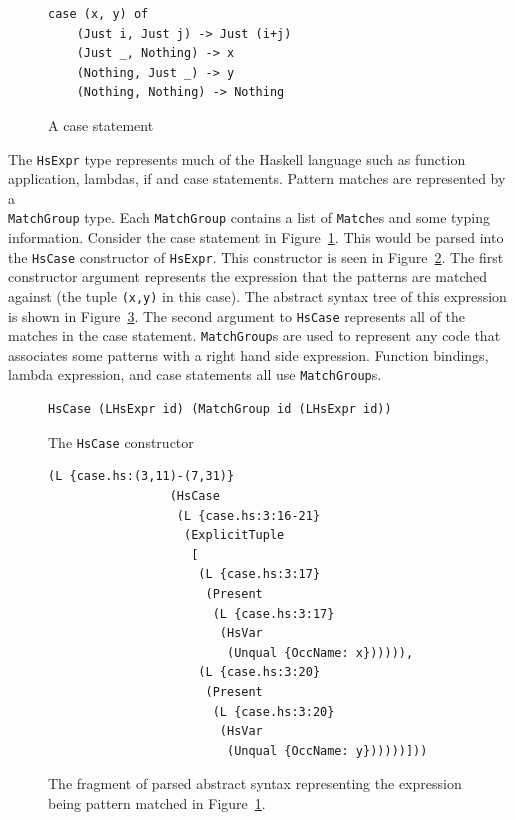 \begin{figure}[t]
\begin{lstlisting}
case (x, y) of
	(Just i, Just j) -> Just (i+j)	
	(Just _, Nothing) -> x
	(Nothing, Just _) -> y
	(Nothing, Nothing) -> Nothing
\end{lstlisting}
\caption{A case statement}
\label{caseStmt}
\end{figure}

The \texttt{HsExpr} type represents much of the Haskell language such as function application, lambdas, if and case statements. Pattern matches are represented by a\\ \texttt{MatchGroup} type. Each \texttt{MatchGroup} contains a list of \texttt{Match}es and some typing information. Consider the case statement in Figure~\ref{caseStmt}. This would be parsed into the \texttt{HsCase} constructor of \texttt{HsExpr}. This constructor is seen in Figure~\ref{hscase}. The first constructor argument represents the expression that the patterns are matched against (the tuple \texttt{(x,y)} in this case). The abstract syntax tree of this expression is shown in Figure~\ref{caseAST}. The second argument to \texttt{HsCase} represents all of the matches in the case statement. \texttt{MatchGroup}s are used to represent any code that associates some patterns with a right hand side expression. Function bindings, lambda expression, and case statements all use \texttt{MatchGroup}s. 

\begin{figure}[t]
\begin{lstlisting}
HsCase (LHsExpr id) (MatchGroup id (LHsExpr id))	
\end{lstlisting}
\caption{The \texttt{HsCase} constructor}
\label{hscase}
\end{figure}

\begin{figure}[t]
\begin{lstlisting}
(L {case.hs:(3,11)-(7,31)} 
                 (HsCase 
                  (L {case.hs:3:16-21} 
                   (ExplicitTuple 
                    [
                     (L {case.hs:3:17} 
                      (Present 
                       (L {case.hs:3:17} 
                        (HsVar 
                         (Unqual {OccName: x}))))),
                     (L {case.hs:3:20} 
                      (Present 
                       (L {case.hs:3:20} 
                        (HsVar 
                         (Unqual {OccName: y})))))]))
\end{lstlisting}
\caption{The fragment of parsed abstract syntax representing the expression being pattern matched in Figure~\ref{caseStmt}.}
\label{caseAST}
\end{figure}

